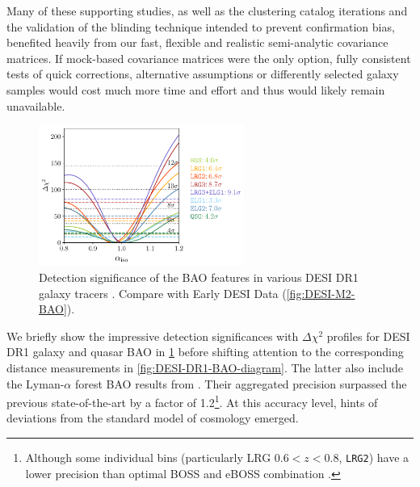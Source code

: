 Many of these supporting studies, as well as the clustering catalog iterations \citep{DESI2024.II.KP3} and the validation of the blinding technique \citep{KP3s9-Andrade} intended to prevent confirmation bias, benefited heavily from our fast, flexible and realistic semi-analytic covariance matrices.
If mock-based covariance matrices were the only option, fully consistent tests of quick corrections, alternative assumptions or differently selected galaxy samples would cost much more time and effort and thus would likely remain unavailable.

\begin{figure}[htbp]
    \centering
    \includegraphics[width=0.6\textwidth]{DR1/bao_detection_level_dr1unblinded.pdf}
    \caption[Detection significance of the BAO features in various DESI DR1 galaxy tracers]{Detection significance of the BAO features in various DESI DR1 galaxy tracers \citep[figure reproduced from][]{DESI2024.III.KP4}.
    Compare with Early DESI Data (\cref{fig:DESI-M2-BAO}).}
    \label{fig:DESI-DR1-BAO-detections}
\end{figure}

We briefly show the impressive detection significances with $\Delta\chi^2$ profiles for DESI DR1 galaxy and quasar BAO in \cref{fig:DESI-DR1-BAO-detections} before shifting attention to the corresponding distance measurements in \cref{fig:DESI-DR1-BAO-diagram}.
The latter also include the Lyman-$\alpha$ forest BAO results from \cite{DESI2024.IV.KP6}.
Their aggregated precision surpassed the previous state-of-the-art by a factor of 1.2\footnote{Although some individual bins (particularly LRG $0.6<z<0.8$, {\tt LRG2}) have a lower precision than optimal BOSS and eBOSS combination \citep{DESI2024.III.KP4,SDSS4-eBOSS-Alam21}.}.
At this accuracy level, hints of deviations from the standard model of cosmology emerged.


